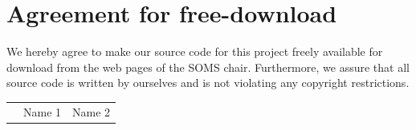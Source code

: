\documentclass[11pt]{article}
\begin{document}

\newpage


\newpage
\section*{Agreement for free-download}
\bigskip


\bigskip


\large We hereby agree to make our source code for this project freely available for download from the web pages of the SOMS chair. Furthermore, we assure that all source code is written by ourselves and is not violating any copyright restrictions.

\begin{center}

\bigskip




\bigskip


\begin{tabular}{@{}p{3.3cm}@{}p{6cm}@{}@{}p{6cm}@{}}
\begin{minipage}{3cm}

\end{minipage}
&
\begin{minipage}{6cm}
\vspace{2mm} \large Name 1

 \vspace{\baselineskip}

\end{minipage}
&
\begin{minipage}{6cm}

\large Name 2

\end{minipage}
\end{tabular}


\end{center}
\newpage







\tableofcontents

\newpage
\end{document}
